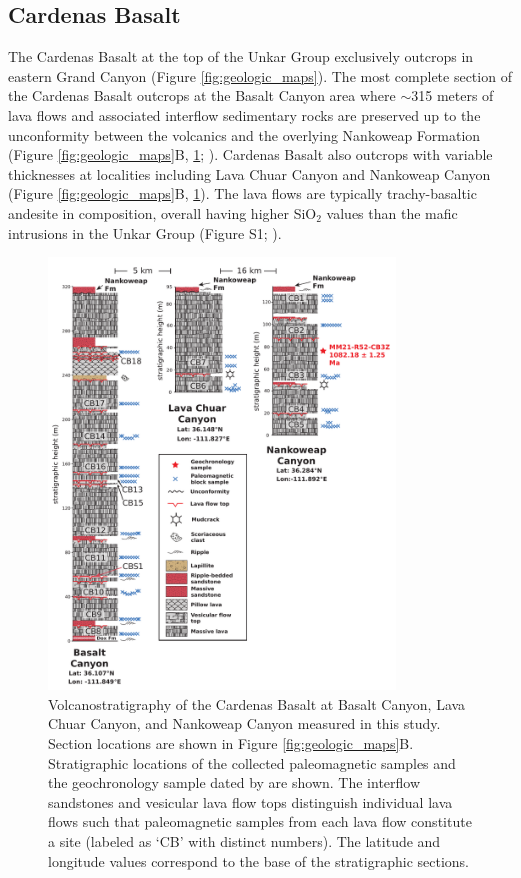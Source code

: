 \subsection*{Cardenas Basalt}

The Cardenas Basalt at the top of the Unkar Group exclusively outcrops in eastern Grand Canyon (Figure \ref{fig:geologic_maps}). The most complete section of the Cardenas Basalt outcrops at the Basalt Canyon area where $\sim$315 meters of lava flows and associated interflow sedimentary rocks are preserved up to the unconformity between the volcanics and the overlying Nankoweap Formation (Figure \ref{fig:geologic_maps}B, \ref{fig:cardenas_strat}; ). Cardenas Basalt also outcrops with variable thicknesses at localities including Lava Chuar Canyon and Nankoweap Canyon (Figure \ref{fig:geologic_maps}B, \ref{fig:cardenas_strat}). The lava flows are typically trachy-basaltic andesite in composition, overall having higher SiO$_2$ values than the mafic intrusions in the Unkar Group (Figure S1; ).

\begin{figure}[h!]
\centering
\includegraphics[width=0.82\textwidth]{figure/Zhang2024b/Cardenas_strat_uniform_scale.pdf}
\caption{Volcanostratigraphy of the Cardenas Basalt at Basalt Canyon, Lava Chuar Canyon, and Nankoweap Canyon measured in this study. Section locations are shown in Figure \ref{fig:geologic_maps}B. Stratigraphic locations of the collected paleomagnetic samples and the geochronology sample dated by  are shown. The interflow sandstones and vesicular lava flow tops distinguish individual lava flows such that paleomagnetic samples from each lava flow constitute a site (labeled as `CB' with distinct numbers). The latitude and longitude values correspond to the base of the stratigraphic sections.}
\label{fig:cardenas_strat}
\end{figure}

